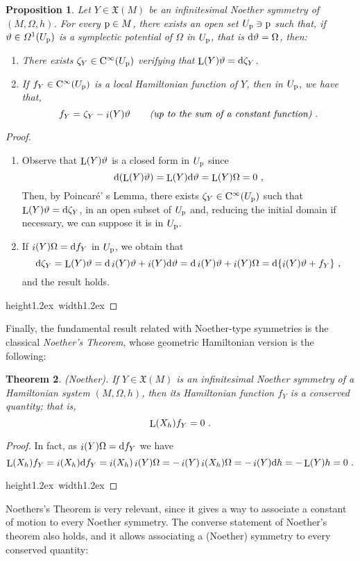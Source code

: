 \documentclass[12pt]{report}
\newtheorem{teor}{Theorem}[chapter]
\newtheorem{prop}[teor]{Proposition}
\def\beq{\begin{equation}}
\def\eeq{\end{equation}}
\def\ben{\begin{enumerate}}
\def\een{\end{enumerate}}
\def\qed{\ifvmode\removelastskip\fi
{\unskip\nobreak\hfil\penalty50\hbox{}\nobreak\hfil
\hbox{\vrule height1.2ex width1.2ex}\parfillskip=0pt
\finalhyphendemerits=0 \par\smallskip}}
\def\vf{\mathfrak X}
\def\df{{\mit\Omega}}
\def\d{{\rm d}}
\def\Lie{\mathop{\rm L}\nolimits}
\def\inn{\mathop{i}\nolimits}
\def\Cinfty{{\rm C}^\infty}
\begin{document}
\begin{prop}
Let $Y\in\vf(M)$ be an infinitesimal Noether symmetry of $(M,\Omega,h)$.
For every ${\rm p}\in M$, there exists an open set $U_{\rm p}\ni {\rm p}$ such that,
if $\vartheta\in\df^1(U_{\rm p})$ is a symplectic potential of $\Omega$
 in $U_{\rm p}$, that is $\d\vartheta=\Omega$, then:
\ben
\item
There exists $\zeta_Y\in\Cinfty(U_{\rm p})$ verifying that 
$\Lie(Y)\vartheta=\d\zeta_Y$.
\item
If $f_Y\in\Cinfty(U_{\rm p})$ is a local Hamiltonian function of $Y$, then
in $U_{\rm p}$, we have that,
\beq
f_Y=\zeta_Y-\inn(Y)\vartheta
\qquad \mbox{\it (up to the sum of a constant function)} \ .
\label{fdos}
\eeq
\een
\label{structure}
\end{prop}
\begin{proof}
\ben
\item
Observe that $\Lie(Y)\vartheta$ is a closed form in $U_{\rm p}$ since
$$
\d(\Lie(Y)\vartheta)=\Lie(Y)\d\vartheta=\Lie(Y)\Omega=0 \ ,
$$
Then, by Poincar\'e' s Lemma, 
there exists $\zeta_Y\in\Cinfty(U_{\rm p})$
such that $\Lie(Y)\vartheta=\d\zeta_Y$, in an open subset of $U_{\rm p}$ and, reducing the initial domain if necessary, we can suppose it is in $U_{\rm p}$.
\item
If $\inn(Y)\Omega=\d f_Y$ in $U_{\rm p}$, we obtain that
$$
\d\zeta_Y=\Lie(Y)\vartheta=\d\inn(Y)\vartheta+\inn(Y)\d\vartheta=
\d\inn(Y)\vartheta+\inn(Y)\Omega=\d \{\inn(Y)\vartheta+f_Y\} \ ,
 $$
and the result holds.
\een
\qed  \end{proof}

 Finally, the fundamental result related with Noether-type symmetries 
is the classical {\sl Noether's Theorem}, whose geometric Hamiltonian version is the following:

\begin{teor}
{\rm (Noether)}.
If $Y\in\vf (M)$ is an infinitesimal Noether symmetry of a Hamiltonian system $(M,\Omega,h)$, then
its Hamiltonian function $f_Y$
is a conserved quantity; that is, $$\Lie (X_h)f_Y=0 \ .$$
\label{Nth}
\end{teor}
\begin{proof}
In fact, as $\inn(Y)\Omega=\d f_Y$ we have
$$
\Lie(X_h)f_Y =
\inn(X_h)\d f_Y = \inn(X_h)\inn(Y)\Omega=
-\inn(Y)\inn(X_h)\Omega = -\inn(Y)\d h= -\Lie(Y) h=0 \ .
$$
\qed  \end{proof}

Noethers's Theorem is very relevant, since it gives a way to associate
a constant of motion to every Noether symmetry.
The converse statement of Noether's theorem also holds, and it
allows associating a (Noether) symmetry to every conserved quantity:
\end{document}
